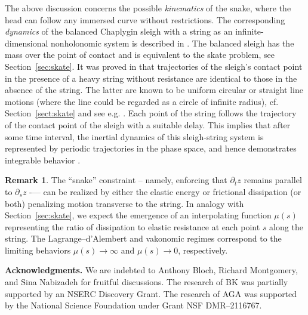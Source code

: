 \documentclass[11pt]{article}
\theoremstyle{definition}
\newtheorem{remark}[lemma]{Remark}
\newcounter{ai}
\begin{document}
The above discussion concerns the possible {\it kinematics} of the snake, where the head can follow any immersed curve without restrictions. The corresponding  {\it dynamics} of the balanced Chaplygin sleigh 
 with a string as an infinite-dimensional nonholonomic system is described in \cite{Zenkov}. 
 The balanced sleigh has the mass over the point of contact and is equivalent to the skate problem, see Section~\ref{sec:skate}. 
It was proved in \cite{Zenkov} that trajectories of the sleigh's contact point  in the presence of a  heavy string without resistance are identical to those in
the absence of the  string. The latter are known to be uniform circular  or straight line motions (where the line could be regarded as a circle of infinite radius), cf. Section~\ref{sect:skate} and see e.g. \cite{bloch2003nonholonomic}. 
Each point of the string follows the trajectory of the contact point of
the sleigh with a suitable delay. This implies that after some time interval, the inertial dynamics of this sleigh-string system is represented by periodic trajectories in the phase space, and hence demonstrates integrable behavior \cite{Zenkov}.

\begin{remark}
The “snake” constraint -- namely, enforcing that $\partial_t z$ remains parallel to $\partial_s z$ -— can be realized by either the elastic energy or frictional dissipation (or both) penalizing motion transverse to the string. In analogy with Section~\ref{sec:skate}, we expect the emergence of an interpolating function $\mu(s)$ representing the ratio of dissipation to elastic resistance at each point $s$ along the string. The Lagrange--d'Alembert and vakonomic regimes correspond to the limiting behaviors $\mu(s) \to \infty$ and $\mu(s) \to 0$, respectively.
\end{remark}







\bigskip

{\bf Acknowledgments.} 
We are indebted to Anthony Bloch, Richard Montgomery, and Sina Nabizadeh
for fruitful discussions. The research of BK was partially supported by an NSERC Discovery Grant. 
The research of AGA was supported by the National Science Foundation under Grant NSF DMR–2116767.


\newpage
\small

%
%


\end{document}
